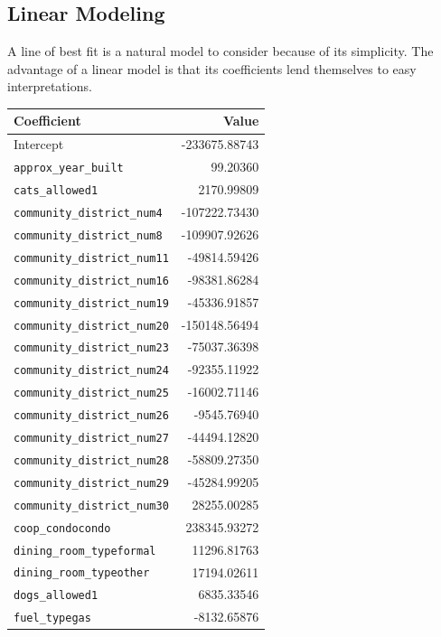 \documentclass[11pt]{article}
\begin{document}
	\subsection{Linear Modeling}
	A line of best fit is a natural model to consider because of its simplicity.
	The advantage of a linear model is that its coefficients lend themselves
	to easy interpretations.
	
	\begin{table}
		\centering
		\small
		\begin{tabular}{|l|r|}
			\hline
			\textbf{Coefficient} & \textbf{Value}\\
			\hline
			Intercept	& -233675.88743	\\		
			\verb|approx_year_built|	& 99.20360\\
			\verb|cats_allowed1|&	2170.99809			\\
			\verb|community_district_num4|	& -107222.73430	\\
			\verb|community_district_num8| &	-109907.92626 \\
			\verb|community_district_num11| &	-49814.59426 \\
			\verb|community_district_num16|&	-98381.86284 \\			
			\verb|community_district_num19| & -45336.91857 \\
			\verb|community_district_num20| & -150148.56494 \\
			\verb|community_district_num23| &	-75037.36398 \\
			\verb|community_district_num24| &	-92355.11922 \\	
			\verb|community_district_num25| &	-16002.71146 \\		
			\verb|community_district_num26| &	-9545.76940	 \\	
			\verb|community_district_num27| &	-44494.12820 \\		
			\verb|community_district_num28| &	-58809.27350 \\		
			\verb|community_district_num29| &	-45284.99205 \\		
			\verb|community_district_num30| &	28255.00285	\\	
			\verb|coop_condocondo|	& 238345.93272 \\
			\verb|dining_room_typeformal|	& 11296.81763	\\
			\verb|dining_room_typeother|	& 17194.02611	\\
			\verb|dogs_allowed1| &	6835.33546			\\
			\verb|fuel_typegas| &	-8132.65876			\\

\end{tabular}
\end{table}
\end{document}
